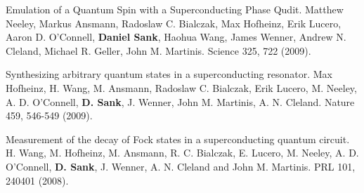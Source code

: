 \documentclass[margin=2cm,line]{res}
\begin{document}
\begin{resume}
\begin{list3}
\item Emulation of a Quantum Spin with a Superconducting Phase Qudit. Matthew Neeley, Markus Ansmann, Radoslaw C. Bialczak, Max Hofheinz, Erik Lucero, Aaron D. O'Connell, \textbf{Daniel Sank}, Haohua Wang, James Wenner, Andrew N. Cleland, Michael R. Geller, John M. Martinis. Science 325, 722 (2009). \\

\item Synthesizing arbitrary quantum states in a superconducting resonator. Max Hofheinz, H. Wang, M. Ansmann, Radoslaw C. Bialczak, Erik Lucero, M. Neeley, A. D. O'Connell, \textbf{D. Sank}, J. Wenner, John M. Martinis, A. N. Cleland. Nature 459, 546-549 (2009). \\

\item Measurement of the decay of Fock states in a superconducting quantum circuit. H. Wang, M. Hofheinz, M. Ansmann, R. C. Bialczak, E. Lucero, M. Neeley, A. D. O'Connell, \textbf{D. Sank}, J. Wenner, A. N. Cleland and John M. Martinis. PRL 101, 240401 (2008).
\\
\end{list3}


\end{resume}
\end{document}
